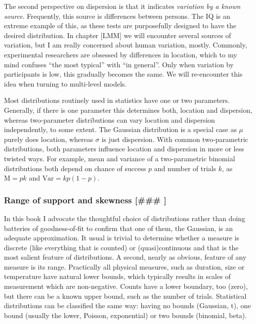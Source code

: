 \documentclass[]{svmono}
\theoremstyle{definition}
\theoremstyle{definition}
\theoremstyle{definition}
\theoremstyle{remark}
\begin{document}
The second perspective on dispersion is that it indicates
\emph{variation by a known source}. Frequently, this source is
differences between persons. The IQ is an extreme example of this, as
these tests are purposefully designed to have the desired distribution.
In chapter {[}LMM{]} we will encounter several sources of variation, but
I am really concerned about human variation, mostly. Commonly,
experimental researchers are obsessed by differences in location, which
to my mind confuses ``the most typical'' with ``in general''. Only when
variation by participants is low, this gradually becomes the same. We
will re-encounter this idea when turning to multi-level models.

Most distributions routinely used in statistics have one or two
parameters. Generally, if there is one parameter this determines both,
location and dispersion, whereas two-parameter distributions can vary
location and dispersion independently, to some extent. The Gaussian
distribution is a special case as \(\mu\) purely does location, whereas
\(\sigma\) is just dispersion. With common two-parametric distributions,
both parameters influence location and dispersion in more or less
twisted ways. For example, mean and variance of a two-parametric
binomial distributions both depend on chance of success \(p\) and number
of trials \(k\), as \(\textrm{M} = pk\) and \(\textrm{Var} = kp(1-p)\).

\subsubsection{Range of support and skewness {[}\#\#\#
{]}}\label{range-of-support-and-skewness}

In this book I advocate the thoughtful choice of distributions rather
than doing batteries of goodness-of-fit to confirm that one of them, the
Gaussian, is an adequate approximation. It usual is trivial to determine
whether a measure is discrete (like everything that is counted) or
(quasi)continuous and that is the most salient feature of distributions.
A second, nearly as obvious, feature of any measure is its range.
Practically all physical measures, such as duration, size or temperature
have natural lower bounds, which typically results in scales of
measurement which are non-negative. Counts have a lower boundary, too
(zero), but there can be a known upper bound, such as the number of
trials. Statistical distributions can be classified the same way: having
no bounds (Gaussian, t), one bound (usually the lower, Poisson,
exponential) or two bounds (binomial, beta).
\end{document}
